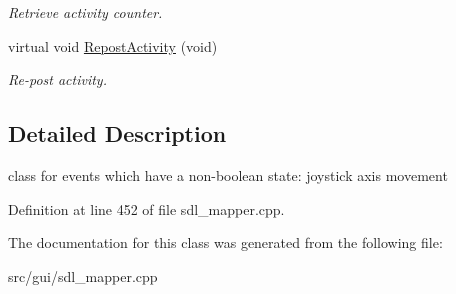 \begin{DoxyCompactItemize}
\begin{DoxyCompactList}\small\item\em Retrieve activity counter. \end{DoxyCompactList}\item 
\hypertarget{classCContinuousEvent_a55ff5be014e082075eaeec0af43a51aa}{virtual void \hyperlink{classCContinuousEvent_a55ff5be014e082075eaeec0af43a51aa}{Repost\-Activity} (void)}\label{classCContinuousEvent_a55ff5be014e082075eaeec0af43a51aa}

\begin{DoxyCompactList}\small\item\em Re-\/post activity. \end{DoxyCompactList}\end{DoxyCompactItemize}


\subsection{Detailed Description}
class for events which have a non-\/boolean state\-: joystick axis movement 

Definition at line 452 of file sdl\-\_\-mapper.\-cpp.



The documentation for this class was generated from the following file\-:\begin{DoxyCompactItemize}
\item 
src/gui/sdl\-\_\-mapper.\-cpp\end{DoxyCompactItemize}
